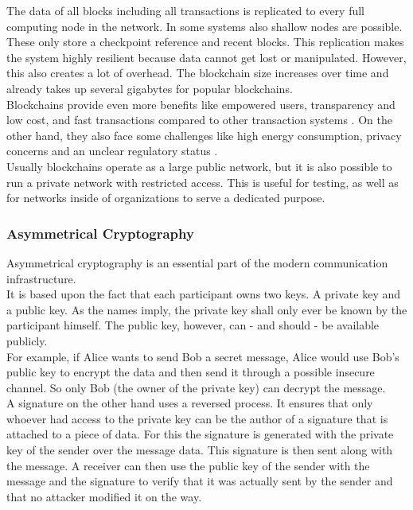\documentclass[a4paper,12pt]{scrartcl}
\begin{document}
The data of all blocks including all transactions is replicated to every full computing node in the network. In some systems also shallow nodes are possible. These only store a checkpoint reference and recent blocks. This replication makes the system highly resilient because data cannot get lost or manipulated. However, this also creates a lot of overhead. The blockchain size increases over time and already takes up several gigabytes for popular blockchains.\\

Blockchains provide even more benefits like empowered users, transparency and low cost, and fast transactions compared to other transaction systems \cite{web5}. On the other hand, they also face some challenges like high energy consumption, privacy concerns and an unclear regulatory status \cite{web5}.\\

Usually blockchains operate as a large public network, but it is also possible to run a private network with restricted access. This is useful for testing, as well as for networks inside of organizations to serve a dedicated purpose.

\subsubsection{Asymmetrical Cryptography}

Asymmetrical cryptography is an essential part of the modern communication infrastructure.\\
It is based upon the fact that each participant owns two keys. A private key and a public key. As the names imply, the private key shall only ever be known by the participant himself. The public key, however, can - and should - be available publicly.\\
For example, if Alice wants to send Bob a secret message, Alice would use Bob's public key to encrypt the data and then send it through a possible insecure channel. So only Bob (the owner of the private key) can decrypt the message.\\

A signature \cite{salomaa2013public} on the other hand uses a reversed process. It ensures that only whoever had access to the private key can be the author of a signature that is attached to a piece of data. For this the signature is generated with the private key of the sender over the message data. This signature is then sent along with the message. A receiver can then use the public key of the sender with the message and the signature to verify that it was actually sent by the sender and that no attacker modified it on the way.
\end{document}

